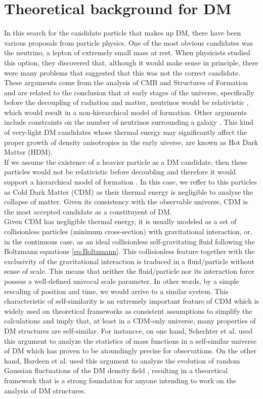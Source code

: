 \section{Theoretical background for DM}
In this search for the candidate particle that makes up DM, there have been various proposals from particle physics. One of the most obvious candidates was the neutrino, a lepton of extremely small mass at rest. When physicists studied this option, they discovered that, although it would make sense in principle, there were many problems that suggested that this was not the correct candidate. These arguments come from the analysis of CMB and Structures of Formation and are related to the conclusion that at early stages of the universe, specifically before the decoupling of radiation and matter, neutrinos would be relativistic \cite{relativistic Neutrinos}, which would result in a non-hierarchical model of formation. Other arguments include constraints on the number of neutrinos surrounding a galaxy \cite{constraint Neutrinos}. This kind of very-light DM candidates whose thermal energy may significantly affect the proper growth of density anisotropies in the early uiverse, are known as Hot Dark Matter (HDM).\\

If we assume the existence of a heavier particle as a DM candidate, then these particles would not be relativistic before decoubling and therefore it would support a hierarchical model of formation \cite{hierarchical model}. In this case, we reffer to this particles as Cold Dark Matter (CDM) as their thermal energy is negligible to analyse the collapse of matter. Given its consistency with the observable universe, CDM is the most accepted candidate as a constituyent of DM.\\

Given CDM has negligible thermal energy, it is usually modeled as a set of collisionless particles (minimum cross-section) with gravitational interaction, or, in the continuous case, as an ideal collisionless self-gravitating fluid following the Boltzmann equations \eqref{eq:Boltzmann}. This collisionless feature together with the exclusivity of the gravitational interaction is traduced in a fluid/particle without sense of scale. This means that neither the fluid/particle nor its interaction force possess a well-defined univocal scale parameter. In other words, by a simple rescaling of position and time, we would arrive to a similar system. This characteristic of self-similarity is an extremely important feature of CDM which is widely used on theoretical frameworks as consistent assumptions to simplify the calculations and imply that, at least in a CDM-only universe, many properties of DM structures are self-similar. For instancce, on one hand, Schechter et al. used this argument to analyze the statistics of mass functions in a self-similar universe of DM \cite{Schechter} which has proven to be atoundingly precise for observations. On the other  hand, Bardeen et al. used this argument to analyze the evolution of random Gaussian fluctuations of the DM density field \cite{Bardeen}, resulting in a theoretical framework that is a strong foundation for anyone intending to work on the analysis of DM structures.\\


